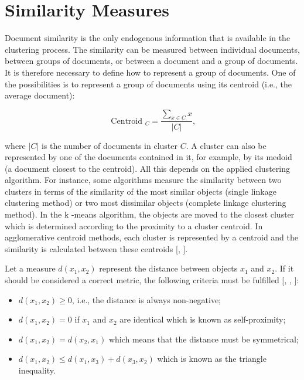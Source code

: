 \section{Similarity Measures}
Document similarity is the only endogenous information that is available in the clustering process. The similarity can be measured between individual documents, between groups of documents, or between a document and a group of documents. It is therefore necessary to define how to represent a group of documents. One of the possibilities is to represent a group of documents using its centroid (i.e., the average document):


\begin{equation*}
\text { Centroid }_{C}=\frac{\sum_{x \in C} x}{|C|}, \tag{12.1}
\end{equation*}


where $|C|$ is the number of documents in cluster $C$. A cluster can also be represented by one of the documents contained in it, for example, by its medoid (a document closest to the centroid). All this depends on the applied clustering algorithm. For instance, some algorithms measure the similarity between two clusters in terms of the similarity of the most similar objects (single linkage clustering method) or two most dissimilar objects (complete linkage clustering method). In the k -means algorithm, the objects are moved to the closest cluster which is determined according to the proximity to a cluster centroid. In agglomerative centroid methods, each cluster is represented by a centroid and the similarity is calculated between these centroids [\cite{ref230}, \cite{ref128}].

Let a measure $d\left(x_{1}, x_{2}\right)$ represent the distance between objects $x_{1}$ and $x_{2}$. If it should be considered a correct metric, the following criteria must be fulfilled [\cite{ref242}, \cite{ref283}, \cite{ref250}]:

\begin{itemize}
  \item $d\left(x_{1}, x_{2}\right) \geq 0$, i.e., the distance is always non-negative;
  \item $d\left(x_{1}, x_{2}\right)=0$ if $x_{1}$ and $x_{2}$ are identical which is known as self-proximity;
  \item $d\left(x_{1}, x_{2}\right)=d\left(x_{2}, x_{1}\right)$ which means that the distance must be symmetrical;
  \item $d\left(x_{1}, x_{2}\right) \leq d\left(x_{1}, x_{3}\right)+d\left(x_{3}, x_{2}\right)$ which is known as the triangle inequality.
\end{itemize}

